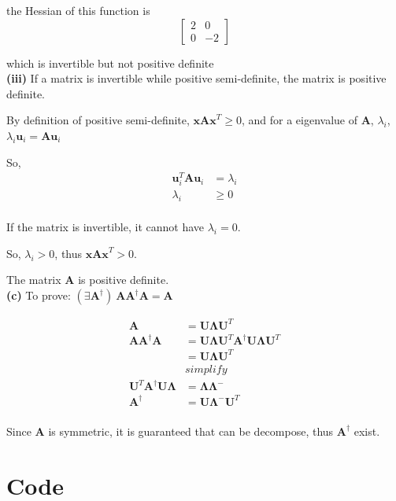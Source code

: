 \documentclass[11pt]{article}
\begin{document}
the Hessian of this function is\\

$$\begin{bmatrix}
2&0\\0&-2
\end{bmatrix}
$$

which is invertible but not positive definite\\

\pagebreak
\textbf{(iii)}
If a matrix is invertible while positive semi-definite, the matrix is positive definite.

By definition of positive semi-definite, $\textbf{xAx}^T\ge 0$, and for a eigenvalue of $\textbf{A}$, $\lambda_i$, $\lambda_i\textbf{u}_i=\textbf{Au}_i$ 

So, 
\begin{equation} \label{eq7}
\begin{split}
\textbf{u}_i^T\textbf{A}\textbf{u}_i&=\lambda_i\\
\lambda_i&\ge 0\\
\end{split}
\end{equation}

If the matrix is invertible, it cannot have $\lambda_i = 0$.

So, $\lambda_i>0$, thus $\textbf{xAx}^T>0$.

The matrix \textbf{A} is positive definite.\\

\noindent\textbf{(c)}
To prove: $(\exists \textbf{A}^\dagger)\ \textbf{AA}^\dagger \textbf{A} = \textbf{A}$

\begin{equation} \label{eq8}
\begin{split}
\textbf{A}&=\textbf{U}\pmb{\Lambda}\textbf{U}^T\\
\textbf{AA}^\dagger \textbf{A}&=\textbf{U}\pmb{\Lambda}\textbf{U}^T\textbf{A}^\dagger\textbf{U}\pmb{\Lambda}\textbf{U}^T\\
&=\textbf{U}\pmb{\Lambda}\textbf{U}^T\\
&simplify\\
\textbf{U}^T\textbf{A}^\dagger\textbf{U}\pmb{\Lambda}&=\pmb{\Lambda}\pmb{\Lambda}^-\\
\textbf{A}^\dagger&=\textbf{U}\pmb{\Lambda}^{-}\textbf{U}^T\\
\end{split}
\end{equation}

Since \textbf{A} is symmetric, it is guaranteed that can be decompose,
thus $\textbf{A}^\dagger$ exist.

\pagebreak
\section*{Code}
\inputminted{python}{py/exercise2.py}
\end{document}
